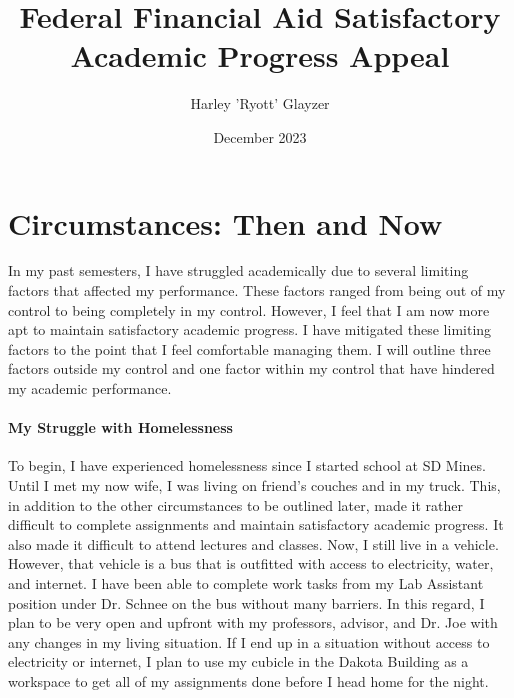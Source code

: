 \documentclass[12pt]{article}
\title{Federal Financial Aid Satisfactory Academic Progress Appeal}
\author{Harley 'Ryott' Glayzer}
\date{December 2023}
\begin{document}
\maketitle

\section*{Circumstances: Then and Now}
In my past semesters, I have struggled academically due to several limiting
factors that affected my performance. 
These factors ranged from being out of my control to being completely in my control.
However, I feel that I am now more apt to maintain satisfactory academic progress.
I have mitigated these limiting factors to the point that I feel comfortable managing them.
I will outline three factors outside my control and one factor within my control 
that have hindered my academic performance.

\paragraph{My Struggle with Homelessness}
To begin, I have experienced homelessness since I started school at SD Mines.
Until I met my now wife, I was living on friend's couches and in my truck. 
This, in addition to the other circumstances to be outlined later,
made it rather difficult to complete assignments and maintain satisfactory academic progress.
It also made it difficult to attend lectures and classes.
Now, I still live in a vehicle. 
However, that vehicle is a bus that is outfitted with access to electricity, water, and internet.
I have been able to complete work tasks from my Lab Assistant position under Dr. Schnee 
on the bus without many barriers.
In this regard, I plan to be very open and upfront with my professors, advisor, 
and Dr. Joe with any changes in my living situation.
If I end up in a situation without access to electricity or internet, I plan to use my
cubicle in the Dakota Building as a workspace to get all of my assignments done 
before I head home for the night.
\end{document}
